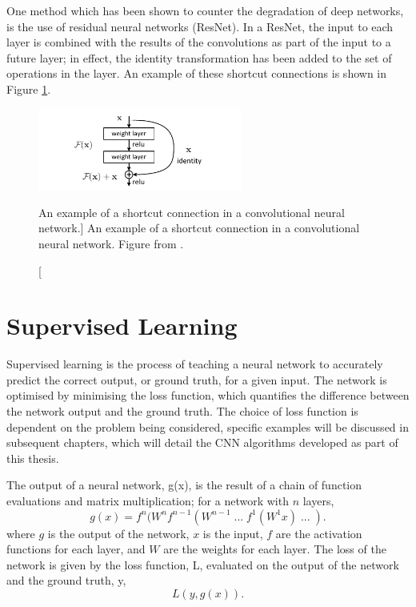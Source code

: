 One method which has been shown to counter the degradation of deep networks, 
is the use of residual neural networks (ResNet). In a ResNet, the input to 
each layer is combined with the results of the convolutions as part of the 
input to a future layer; in effect, the identity transformation has been added
to the set of operations in the layer. An example of these shortcut connections 
is shown in Figure \ref{fig:short_connect}\cite{He_2016_CVPR}. 
\begin{figure}
	\centering
	\includegraphics[width = 0.6\textwidth]{figures/short_connect.pdf}
	\caption
	[An example of a shortcut connection in a convolutional neural network.]
	{An example of a shortcut connection in a convolutional neural network.
	Figure from \cite{He_2016_CVPR}.}
	\label{fig:short_connect}
\end{figure}

\section{Supervised Learning}
Supervised learning is the process of teaching a neural network to accurately
predict the correct output, or ground truth, for a given input. The network is 
optimised by minimising the loss function, which quantifies the difference 
between the network output and the ground truth. The choice of loss function 
is dependent on the problem being considered, specific examples will be 
discussed in subsequent chapters, which will detail the CNN algorithms 
developed as part of this thesis.

The output of a neural network, g(x), is the result of a chain of function 
evaluations and matrix multiplication; for a network with $n$ layers,
\begin{equation*}
	g(x) = f^n(W^n f^{n-1}(W^{n-1} \;...\; f^1(W^1 x) \;...\; ).
\end{equation*}
where $g$ is the output of the network, $x$ is the input, $f$ are the 
activation functions for each layer, and $W$ are the weights for each layer. 
The loss of the network is given by the loss function, L,  evaluated on the 
output of the network and the ground truth, y,
\begin{equation*}
	L(y, g(x)).
\end{equation*}

